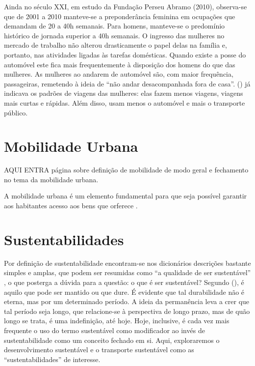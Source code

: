 Ainda no século XXI, em estudo da Fundação Perseu Abramo (2010), observa-se que de 2001 a 2010 manteve-se a preponderância feminina em ocupações que demandam de 20 a 40h semanais.
Para homens, manteve-se o predomínio histórico de jornada superior a 40h semanais. O ingresso das mulheres no mercado de trabalho não alterou drasticamente o papel delas na família e, portanto, nas atividades ligadas às
tarefas domésticas.
Quando existe a posse do automóvel este fica mais frequentemente à disposição dos homens do que das mulheres.
As mulheres ao andarem de automóvel são, com maior frequência, passageiras, remetendo à ideia de “não andar desacompanhada fora de casa”. (\citeyear{FOX1983}) já indicava os padrões de viagens das mulheres: elas fazem menos viagens, viagens mais curtas e rápidas. Além disso, usam menos o automóvel e mais o transporte público.

\clearpage
\section{Mobilidade Urbana}

AQUI ENTRA página sobre definição de mobilidade de modo geral e fechamento no tema da mobilidade urbana.


A mobilidade urbana é um elemento fundamental para que seja possível garantir aos habitantes acesso aos bens que orferece \cite{IEMA2010}.

\clearpage
\section{Sustentabilidades}

Por definição de sustentabilidade encontram-se nos dicionários descrições bastante simples e amplas, que podem ser resumidas como ``a qualidade de ser sustentável'' \cite{MICHAELIS}, o que posterga a dúvida para a questão: o que é ser sustentável? Segundo  (\citeyear{BLACK2010}), é aquilo que pode ser mantido ou que dure. É evidente que tal durabilidade não é eterna, mas por um determinado período. A ideia da permanência leva a crer que tal período seja longo, que relacione-se à perspectiva de longo prazo, mas de quão longo se trata, é uma indefinição, até hoje. Hoje, inclusive, é cada vez mais frequente o uso do termo sustentável como modificador ao invés de sustentabilidade como um conceito fechado em si. Aqui, exploraremos o desenvolvimento  sustentável e o transporte sustentável como as ``sustentabilidades'' de interesse.

